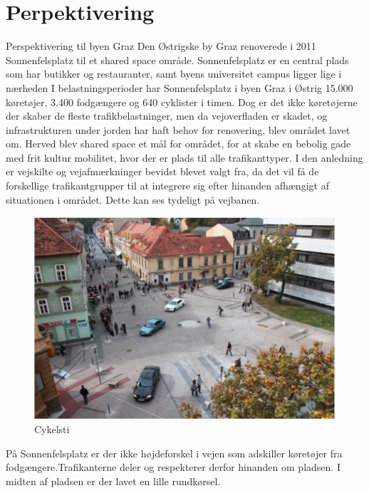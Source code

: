 \chapter{Perpektivering}
\label{chap:perpektivering}

Perspektivering til byen Graz
Den Østrigske by Graz renoverede i 2011 Sonnenfelsplatz til et shared space område. Sonnenfelsplatz er en central plads som har butikker og restauranter, samt byens universitet campus ligger lige i nærheden %
 I belastningsperioder har Sonnenfelsplatz i byen Graz i Østrig 15.000 køretøjer, 3.400 fodgængere og 640 cyklister i timen. Dog er det ikke køretøjerne der skaber de fleste trafikbelastninger, men da vejoverfladen er skadet, og infrastrukturen under jorden har haft behov for renovering, blev området lavet om. Herved blev shared space et mål for området, for at skabe en bebolig gade med frit kultur mobilitet, hvor der er plads til alle trafikanttyper. I den anledning er vejskilte og vejafmærkninger bevidst blevet valgt fra, da det vil få de forskellige trafikantgrupper til at integrere sig efter hinanden afhængigt af situationen i området. Dette kan ses tydeligt på vejbanen.
 \begin{figure}[htbp]
   \centering
   \begin{adjustbox}{max width=\textwidth}
     \includegraphics{figures/Billederogfigur/Perspektivering/en_andne_by.png}
  \end{adjustbox}
   \caption{Cykelsti}
    \label{fig:cykelsti}
 \end{figure}
 På Sonnenfelsplatz er der ikke højdeforskel i vejen som adskiller køretøjer fra fodgængere.Trafikanterne deler og respekterer derfor hinanden om pladsen. I midten af pladsen er der lavet en lille rundkørsel.%


